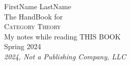 \begin{titlepage}
  \raggedleft
  {\Large FirstName LastName\\[1in]}
  {\large The HandBook for\\}
  {\Huge\scshape Category Theory\\[.2in]}
  {\large My notes while reading THIS BOOK
  \\}
  {\large Spring 2024\\}
  \vfill
    {\itshape 2024, Not a Publishing Company, LLC}
\end{titlepage}
